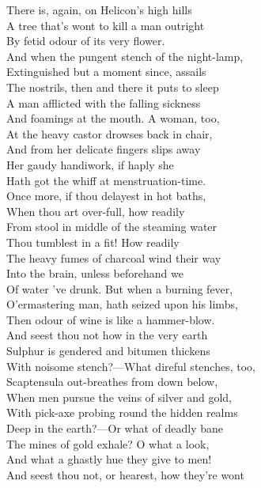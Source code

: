 There is, again, on Helicon's high hills\\
A tree that's wont to kill a man outright\\
By fetid odour of its very flower.\\
And when the pungent stench of the night-lamp,\\
Extinguished but a moment since, assails\\
The nostrils, then and there it puts to sleep\\
A man afflicted with the falling sickness\\
And foamings at the mouth. A woman, too,\\
At the heavy castor drowses back in chair,\\
And from her delicate fingers slips away\\
Her gaudy handiwork, if haply she\\
Hath got the whiff at menstruation-time.\\
Once more, if thou delayest in hot baths,\\
When thou art over-full, how readily\\
From stool in middle of the steaming water\\
Thou tumblest in a fit! How readily\\
The heavy fumes of charcoal wind their way\\
Into the brain, unless beforehand we\\
Of water 've drunk. But when a burning fever,\\
O'ermastering man, hath seized upon his limbs,\\
Then odour of wine is like a hammer-blow.\\
And seest thou not how in the very earth\\
Sulphur is gendered and bitumen thickens\\
With noisome stench?—What direful stenches, too,\\
Scaptensula out-breathes from down below,\\
When men pursue the veins of silver and gold,\\
With pick-axe probing round the hidden realms\\
Deep in the earth?—Or what of deadly bane\\
The mines of gold exhale? O what a look,\\
And what a ghastly hue they give to men!\\
And seest thou not, or hearest, how they're wont\\
